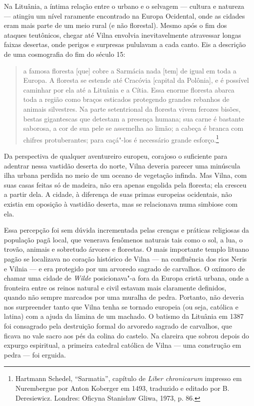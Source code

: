 %

Na Lituânia, a íntima relação entre o urbano e o selvagem --- cultura e
natureza --- atingiu um nível raramente encontrado na Europa Ocidental,
onde as cidades eram mais parte de um meio rural (e não florestal).
Mesmo após o fim dos ataques teutônicos, chegar até Vilna envolvia
inevitavelmente atravessar longas faixas desertas, onde perigos e
surpresas pululavam a cada canto. Eis a descrição de uma cosmografia do
fim do século 15:

\begin{quote}
a famosa floresta {[}que{]} cobre a Sarmácia nada {[}tem{]} de igual
em toda a Europa. A floresta se estende até Cracóvia {[}capital da
Polônia{]}, e é possível caminhar por ela até a Lituânia e a Cítia. Essa
enorme floresta abarca toda a região como braços esticados protegendo
grandes rebanhos de animais silvestres. Na parte setentrional da
floresta vivem ferozes bisões, bestas gigantescas que detestam a
presença humana; sua carne é bastante saborosa, a cor de sua pele se
assemelha ao limão; a cabeça é branca com chifres protuberantes; para
caçá"-los é necessário grande esforço.\footnote{Hartmann Schedel, ``Sarmatia'', capítulo de \textit{Liber chronicarum} impresso em Nurembergue por Anton Koberger em 1493, traduzido e editado por B. Deresiewicz. Londres: Oficyna Stanisław Gliwa, 1973, p. 86.} \end{quote}

\asterisc

Da perspectiva de qualquer aventureiro europeu, corajoso o suficiente
para adentrar nessa vastidão deserta do norte, Vilna deveria parecer uma
minúscula ilha urbana perdida no meio de um oceano de vegetação infinda.
Mas Vilna, com suas casas feitas só de madeira, não era apenas engolida
pela floresta; ela cresceu a partir dela. A cidade, à diferença de suas
primas europeias ocidentais, não existia em oposição à vastidão deserta,
mas se relacionava numa simbiose com ela.

Essa percepção foi sem dúvida incrementada pelas crenças e práticas
religiosas da população pagã local, que venerava fenômenos naturais tais
como o sol, a lua, o trovão, animais e sobretudo árvores e florestas. O
mais importante templo lituano pagão se localizava no coração histórico
de Vilna --- na confluência dos rios Neris e Vilnia --- e era protegido por
um arvoredo sagrado de carvalhos. O oxímoro de chamar uma cidade de
\textit{Wilde} posicionava"-a fora da Europa cristã urbana, onde a
fronteira entre os reinos natural e civil estavam mais claramente
definidos, quando não sempre marcados por uma muralha de pedra.
Portanto, não deveria nos surpreender tanto que Vilna tenha se tornado
europeia (ou seja, católica e latina) com a ajuda da lâmina de um
machado. O batismo da Lituânia em 1387 foi consagrado pela destruição
formal do arvoredo sagrado de carvalhos, que ficava no vale sacro aos
pés da colina do castelo. Na clareira que sobrou depois do expurgo
espiritual, a primeira catedral católica de Vilna --- uma construção em
pedra --- foi erguida.

